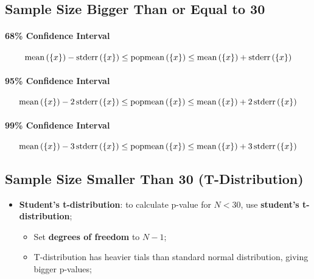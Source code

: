   \subsection{Sample Size Bigger Than or Equal to 30}
  
    \paragraph{68\% Confidence Interval}
    \begin{equation}
      \operatorname{mean}\left(\{ x \}\right) - \operatorname{stderr}\left(\{ x \}\right) \leq \operatorname{popmean}\left(\{ x \}\right) \leq \operatorname{mean}\left(\{ x \}\right) + \operatorname{stderr}\left(\{ x \}\right)
    \end{equation}
    
    \paragraph{95\% Confidence Interval}
    \begin{equation}
      \operatorname{mean}\left(\{ x \}\right) - 2 \operatorname{stderr}\left(\{ x \}\right) \leq \operatorname{popmean}\left(\{ x \}\right) \leq \operatorname{mean}\left(\{ x \}\right) + 2 \operatorname{stderr}\left(\{ x \}\right)
    \end{equation}
    
    \paragraph{99\% Confidence Interval}
    \begin{equation}
      \operatorname{mean}\left(\{ x \}\right) - 3 \operatorname{stderr}\left(\{ x \}\right) \leq \operatorname{popmean}\left(\{ x \}\right) \leq \operatorname{mean}\left(\{ x \}\right) + 3 \operatorname{stderr}\left(\{ x \}\right)
    \end{equation}
  
  \subsection{Sample Size Smaller Than 30 (T-Distribution)}
  
    \begin{itemize}
      \item \textbf{Student's t-distribution}: to calculate p-value for $ N < 30 $, use \textbf{student's t-distribution};
      \begin{itemize}
        \item Set \textbf{degrees of freedom} to $ N - 1 $;
        \item T-distribution has heavier tials than standard normal distribution, giving bigger p-values;
      \end{itemize}
    \end{itemize}
    
